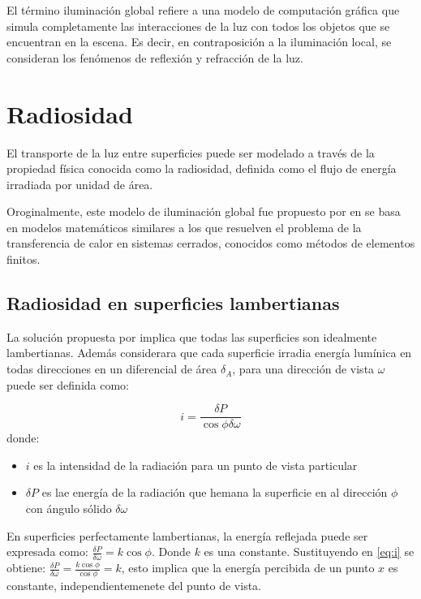 El término iluminación global refiere a una modelo de
computación gráfica que simula completamente las interacciones de la luz con todos los objetos que se encuentran 
en la escena. Es decir, en contraposición a la iluminación local, se consideran los fenómenos de
reflexión y refracción de la luz.

\section{Radiosidad}
\label{sec:radiosidad}

El transporte de la luz entre superficies puede ser modelado a través de la propiedad física conocida como
la radiosidad, definida como el flujo de energía irradiada por unidad de área. 

Oroginalmente, este modelo de iluminación global fue propuesto por \citeauthor{Goral} en \citeyear{Goral} se basa en modelos matemáticos
similares a los que resuelven el problema de la transferencia de calor en sistemas cerrados, conocidos como métodos de elementos finitos.

\subsection{Radiosidad en superficies lambertianas}

La solución propuesta por \citeauthor{Goral} implica que todas las superficies son idealmente lambertianas. Además considerara
que cada superficie irradia energía lumínica en todas direcciones en un diferencial de área $\delta_{A}$, para una dirección de vista $\omega$ puede ser definida como:

\begin{equation}
    i = \frac{\delta{P}}{\cos{\phi\delta\omega}} \label{eq:i}
\end{equation}
donde:
\begin{itemize}
    \item $i$ es la intensidad de la radiación para un punto de vista particular
    \item $\delta{P}$ es lae energía de la radiación que hemana la superficie en al dirección $\phi$ con ángulo sólido $\delta\omega$
\end{itemize}

En superficies perfectamente lambertianas, la energía reflejada puede ser expresada como: $\frac{\delta{P}}{\delta{\omega}} = k\cos{\phi}$. Donde $k$ es una constante.
Sustituyendo en \eqref{eq:i} se obtiene: $\frac{\delta{P}}{\delta{\omega}} = \frac{k\cos{\phi}}{\cos{\phi}} = k$, esto implica que la energía percibida de un punto $x$ 
es constante, independientemenete del punto de vista.

